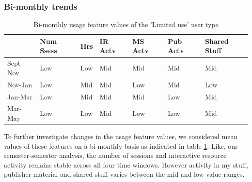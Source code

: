 \documentclass{acm_proc_article-sp}
\begin{document}
\subsubsection{Bi-monthly trends}
\begin{table}
\caption{Bi-monthly usage feature values of the 'Limited use' user type}
\label{cluster0bimonthly}
\begin{tabular}{|p{1.5cm}|p{0.6cm}|p{0.6cm}|p{0.6cm}|p{0.6cm}|p{0.8cm}|p{0.8cm}|}
 & Num Ssess & Hrs & IR Actv & MS Actv & Pub Actv & Shared Stuff \\ \hline
Sept-Nov & Low & Low  & Mid & Mid & Mid & Mid \\ \hline
Nov-Jan & Low & Mid  & Mid & Low & Mid & Low \\ \hline
Jan-Mar & Low & Mid  & Mid & Mid & Low & Mid \\ \hline
Mar-May & Low & Low  & Mid & Low & Low & Mid \\ \hline
\end{tabular}
\end{table}
To further investigate changes in the usage feature values, we considered mean values of these features on a bi-monthly basis as indicated in table \ref{cluster0bimonthly}. Like, our semester-semester analysis, the number of sessions and interactive resource activity remains stable across all four time windows.  However activity in my stuff, publisher material and shared stuff  varies between the mid and low value ranges. 
\end{document}
